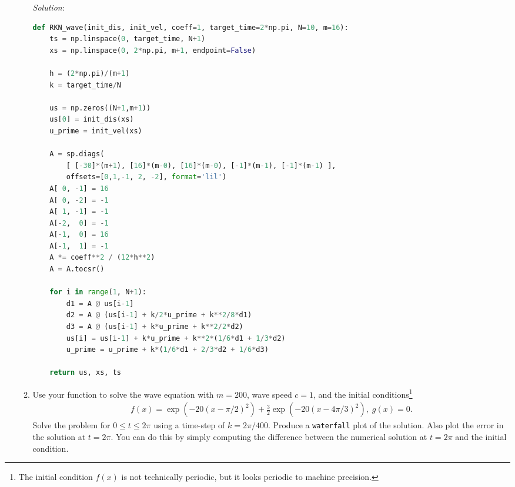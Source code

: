 \documentclass[final,oneside,onecolumn]{article}
\begin{document}
\begin{enumerate}
\begin{enumerate}
\textit{Solution}:
\begin{lstlisting}[language=Python]
def RKN_wave(init_dis, init_vel, coeff=1, target_time=2*np.pi, N=10, m=16):
    ts = np.linspace(0, target_time, N+1)
    xs = np.linspace(0, 2*np.pi, m+1, endpoint=False)
    
    h = (2*np.pi)/(m+1)
    k = target_time/N
    
    us = np.zeros((N+1,m+1))
    us[0] = init_dis(xs)
    u_prime = init_vel(xs)
    
    A = sp.diags(
        [ [-30]*(m+1), [16]*(m-0), [16]*(m-0), [-1]*(m-1), [-1]*(m-1) ], 
        offsets=[0,1,-1, 2, -2], format='lil')
    A[ 0, -1] = 16
    A[ 0, -2] = -1
    A[ 1, -1] = -1
    A[-2,  0] = -1
    A[-1,  0] = 16
    A[-1,  1] = -1
    A *= coeff**2 / (12*h**2)
    A = A.tocsr()
    
    for i in range(1, N+1):
        d1 = A @ us[i-1]
        d2 = A @ (us[i-1] + k/2*u_prime + k**2/8*d1)
        d3 = A @ (us[i-1] + k*u_prime + k**2/2*d2)
        us[i] = us[i-1] + k*u_prime + k**2*(1/6*d1 + 1/3*d2)
        u_prime = u_prime + k*(1/6*d1 + 2/3*d2 + 1/6*d3)
    
    return us, xs, ts
\end{lstlisting}

\bigbreak
\item \label{prob:wave_eq} Use your function to solve the wave equation with $m=200$, wave speed $c=1$, and the initial conditions\footnote{The initial condition $f(x)$ is not technically periodic, but it looks periodic to machine precision.}
\begin{align*}
f(x) = \exp(-20(x-\pi/2)^2) + \frac32 \exp(-20(x-4\pi/3)^2),\; g(x) = 0.
\end{align*}
Solve the problem for $0 \leq t \leq 2\pi$ using a time-step of $k=2\pi/400$.  Produce a \verb|waterfall| plot of the solution.  Also plot the error in the solution at $t=2\pi$.  You can do this by simply computing the difference between the numerical solution at $t=2\pi$ and the initial condition.
\bigbreak


\end{enumerate}
\end{enumerate}
\end{document}
